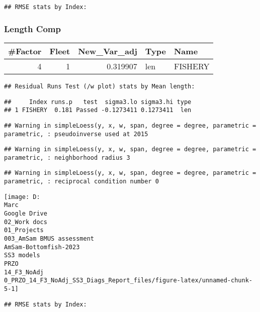 \documentclass[
]{article}
\begin{document}
\begin{verbatim}
## RMSE stats by Index:
\end{verbatim}

\hypertarget{length-comp}{%
\subsubsection{Length Comp}\label{length-comp}}

\captionsetup[table]{labelformat=empty,skip=1pt}
\begin{longtable}{rrrll}
\toprule
\#Factor & Fleet & New\_Var\_adj & Type & Name \\ 
\midrule
4 & 1 & 0.319907 & len & FISHERY \\ 
\bottomrule
\end{longtable}

\begin{verbatim}
## Residual Runs Test (/w plot) stats by Mean length:
\end{verbatim}

\begin{verbatim}
##     Index runs.p   test  sigma3.lo sigma3.hi type
## 1 FISHERY  0.181 Passed -0.1273411 0.1273411  len
\end{verbatim}

\begin{verbatim}
## Warning in simpleLoess(y, x, w, span, degree = degree, parametric = parametric, : pseudoinverse used at 2015
\end{verbatim}

\begin{verbatim}
## Warning in simpleLoess(y, x, w, span, degree = degree, parametric = parametric, : neighborhood radius 3
\end{verbatim}

\begin{verbatim}
## Warning in simpleLoess(y, x, w, span, degree = degree, parametric = parametric, : reciprocal condition number 0
\end{verbatim}

\begin{center}\texttt{[image: D:\\Marc\\Google Drive\\02\_Work docs\\01\_Projects\\003\_AmSam BMUS assessment\\AmSam-Bottomfish-2023\\SS3 models\\PRZO\\14\_F3\_NoAdj\\0\_PRZO\_14\_F3\_NoAdj\_SS3\_Diags\_Report\_files/figure-latex/unnamed-chunk-5-1]} \end{center}

\begin{verbatim}
## RMSE stats by Index:
\end{verbatim}
\end{document}
